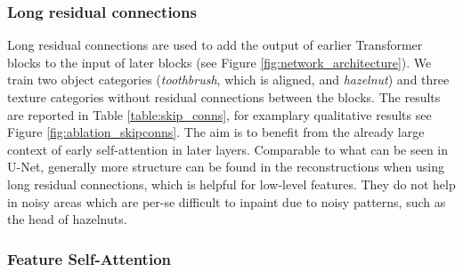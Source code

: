 \documentclass[final,5p,times,twocolumn]{elsarticle}
\begin{document}
	\subsubsection{Long residual connections}
	\label{ablation:skip_conns} 
	
	Long residual connections are used to add the output of earlier Transformer blocks to the input of later blocks (see Figure \ref{fig:network_architecture}). We train two object categories (\textit{toothbrush}, which is aligned, and \textit{hazelnut}) and three texture categories without residual connections between the blocks. The results are reported in Table \ref{table:skip_conns}, for examplary qualitative results see Figure \ref{fig:ablation_skipconns}. The aim is to benefit from the already large context of early self-attention in later layers. Comparable to what can be seen in U-Net, generally more structure can be found in the reconstructions when using long residual connections, which is helpful for low-level features. They do not help in noisy areas which are per-se difficult to inpaint due to noisy patterns, such as the head of hazelnuts.
	
	\begin{table}[ht]
		\begin{center}
			\label{table:skip_conns}
		\end{center}
	\end{table}
	
	\subsubsection{Feature Self-Attention}
	\label{ablation:feature_attention}
	
\end{document}

